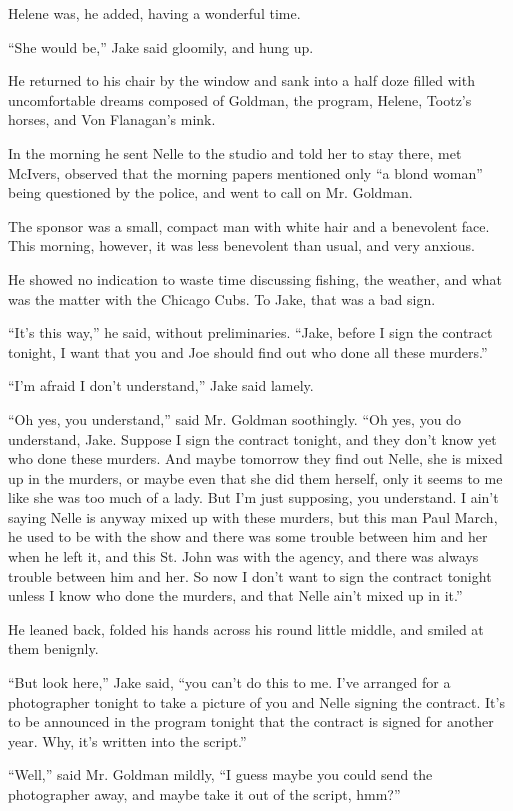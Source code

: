 \documentclass{novel}
\begin{document}
Helene was, he added, having a wonderful time.

“She would be,” Jake said gloomily, and hung up.

He returned to his chair by the window and sank into a half doze filled with uncomfortable dreams composed of Goldman, the program, Helene, Tootz’s horses, and Von Flanagan’s mink.

In the morning he sent Nelle to the studio and told her to stay there, met McIvers, observed that the morning papers mentioned only “a blond woman” being questioned by the police, and went to call on Mr. Goldman.

The sponsor was a small, compact man with white hair and a benevolent face. This morning, however, it was less benevolent than usual, and very anxious.

He showed no indication to waste time discussing fishing, the weather, and what was the matter with the Chicago Cubs. To Jake, that was a bad sign.

“It’s this way,” he said, without preliminaries. “Jake, before I sign the contract tonight, I want that you and Joe should find out who done all these murders.”

“I’m afraid I don’t understand,” Jake said lamely.

“Oh yes, you understand,” said Mr. Goldman soothingly. “Oh yes, you do understand, Jake. Suppose I sign the contract tonight, and they don’t know yet who done these murders. And maybe tomorrow they find out Nelle, she is mixed up in the murders, or maybe even that she did them herself, only it seems to me like she was too much of a lady. But I’m just supposing, you understand. I ain’t saying Nelle is anyway mixed up with these murders, but this man Paul March, he used to be with the show and there was some trouble between him and her when he left it, and this St. John was with the agency, and there was always trouble between him and her. So now I don’t want to sign the contract tonight unless I know who done the murders, and that Nelle ain’t mixed up in it.”

He leaned back, folded his hands across his round little middle, and smiled at them benignly.

“But look here,” Jake said, “you can’t do this to me. I’ve arranged for a photographer tonight to take a picture of you and Nelle signing the contract. It’s to be announced in the program tonight that the contract is signed for another year. Why, it’s written into the script.”

“Well,” said Mr. Goldman mildly, “I guess maybe you could send the photographer away, and maybe take it out of the script, hmm?”
\end{document}
